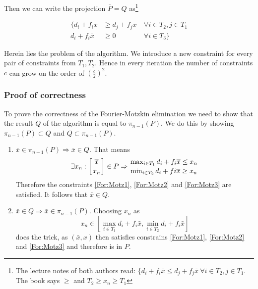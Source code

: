 
Then we can write the projection $\overline P=Q$ as\footnote{The lecture notes of both authors read: $\{d_i+f_i\bar x \leq d_j+f_j\bar x\ \forall i\in T_2, j\in T_1 $. The book says $\geq$ and $T_2\geq x_n \geq T_1$}

\begin{eqnarray*}
\{d_i+f_i\bar x & \geq d_j+f_j\bar x\ & \forall i\in T_2, j\in T_1  \\
d_i+f_i\bar x & \geq 0\ & \forall i\in T_3\}
\end{eqnarray*}


Herein lies the problem of the algorithm. We introduce a new constraint for every pair of constraints from $T_1,T_2$. Hence in every iteration the number of constraints $c$ can grow on the order of $(\frac{c}{2})^2$.

\subsubsection*{Proof of correctness}
\begin{pr} To prove the correctness of the Fourier-Motzkin elimination we need to show that the result $Q$ of the algorithm is equal to $\pi_{n-1}(P)$. We do this by showing $\pi_{n-1}(P) \subset Q$ and $Q \subset \pi_{n-1}(P)$.
\begin{enumerate}

\item $\bar x \in \pi_{n-1}(P) \Rightarrow \bar x\in Q$. That means 
\[\exists x_n: \left[{\bar x}\atop{x_n}\right] \in P \Rightarrow {{\max_{i\in T_1} d_i +f_i \bar x \leq x_n} \atop {\min_{i\in T_2} d_i+fi\bar x \geq x_n}}\]
Therefore the constraints \ref{For:Motz1}, \ref{For:Motz2} and \ref{For:Motz3} are satisfied. It follows that $\bar x \in Q$. 

\item $\bar x \in Q \Rightarrow \bar x \in \pi_{n-1}(P)$. Choosing $x_n$ as 
\[x_n \in [\max_{i\in T_1} d_i+f_i \bar x, \min_{i\in T_2} d_i+f_i \bar x]\]
does the trick, as $(\bar x, x)$ then satisfies constrains \ref{For:Motz1}, \ref{For:Motz2} and \ref{For:Motz3} and therefore is in $P$.

\end{enumerate}
\end{pr}

